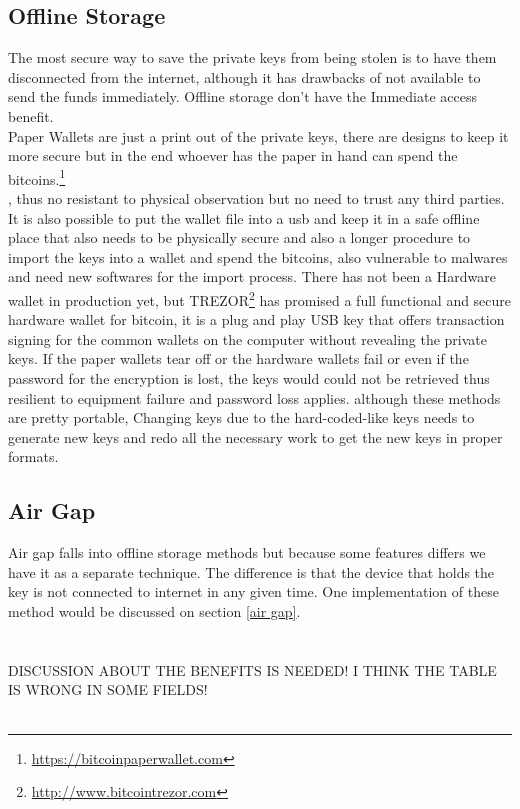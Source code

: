 \subsection{Offline Storage}
\label{sec:offline storage}
The most secure way to save the private keys from being stolen is to have them disconnected from the internet, although it has drawbacks of not available to send the funds immediately. Offline storage don't have the Immediate access benefit.\\
Paper Wallets are just a print out of the private keys, there are designs to keep it more secure but in the end whoever has the paper in hand can spend the bitcoins.\footnote{\url {https://bitcoinpaperwallet.com}}\\, thus no resistant to physical observation but no need to trust any third parties.
It is also possible to put the wallet file into a usb and keep it in a safe offline place that also needs to be physically secure and also a longer procedure to import the keys into a wallet and spend the bitcoins, also vulnerable to malwares and need new softwares for the import process. There has not been a Hardware wallet in production yet, but TREZOR\footnote{\url {http://www.bitcointrezor.com}} has promised a full functional and secure hardware wallet for bitcoin, it is a plug and play USB key that offers transaction signing for the common wallets on the computer without revealing the private keys. If the paper wallets tear off or the hardware wallets fail or even if the password for the encryption is lost, the keys would could not be retrieved thus resilient to equipment failure and password loss applies. although these methods are pretty portable, Changing keys due to the hard-coded-like keys needs to generate new keys and redo all the necessary work to get the new keys in proper formats.

\subsection{Air Gap}
Air gap falls into offline storage methods but because some features differs we have it as a separate technique. The difference is that the device that holds the key is not connected to internet in any given time. One implementation of these method would be discussed on section \ref{air gap}. \\ \\ \\ DISCUSSION ABOUT THE BENEFITS IS NEEDED! I THINK THE TABLE IS WRONG IN SOME FIELDS! \\ \\ 


